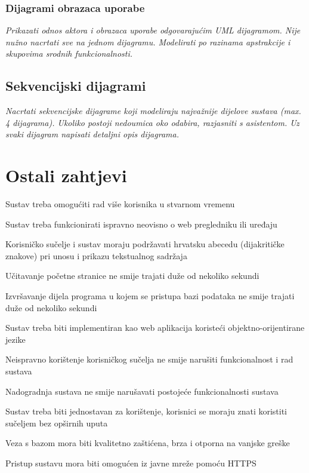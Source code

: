 					
					
					
					
				\subsubsection{Dijagrami obrazaca uporabe}
					
					\textit{Prikazati odnos aktora i obrazaca uporabe odgovarajućim UML dijagramom. Nije nužno nacrtati sve na jednom dijagramu. Modelirati po razinama apstrakcije i skupovima srodnih funkcionalnosti.}
				\eject		
				
			\subsection{Sekvencijski dijagrami}
				
				\textit{Nacrtati sekvencijske dijagrame koji modeliraju najvažnije dijelove sustava (max. 4 dijagrama). Ukoliko postoji nedoumica oko odabira, razjasniti s asistentom. Uz svaki dijagram napisati detaljni opis dijagrama.}
				\eject
	
		\section{Ostali zahtjevi}
		 
			 \begin{packed_item}
			 
			 \item Sustav treba omogućiti rad više korisnika u stvarnom vremenu
			 \item Sustav treba funkcionirati ispravno neovisno o web pregledniku ili uređaju
			 \item Korisničko sučelje i sustav moraju podržavati hrvatsku abecedu (dijakritičke znakove) pri unosu i prikazu tekstualnog sadržaja
			 \item Učitavanje početne stranice ne smije trajati duže od nekoliko sekundi
			 \item Izvršavanje dijela programa u kojem se pristupa bazi podataka ne smije trajati duže od nekoliko sekundi
			 \item Sustav treba biti implementiran kao web aplikacija koristeći objektno-orijentirane jezike
			 \item Neispravno korištenje korisničkog sučelja ne smije narušiti funkcionalnost i rad sustava
			 \item Nadogradnja sustava ne smije narušavati postojeće funkcionalnosti sustava
			 \item Sustav treba biti jednostavan za korištenje, korisnici se moraju znati koristiti sučeljem bez opširnih uputa
			 \item Veza s bazom mora biti kvalitetno zaštićena, brza i otporna na vanjske greške
			 \item Pristup sustavu mora biti omogućen iz javne mreže pomoću HTTPS
			 
			 
			 \end{packed_item}
			 
			 
			 
	